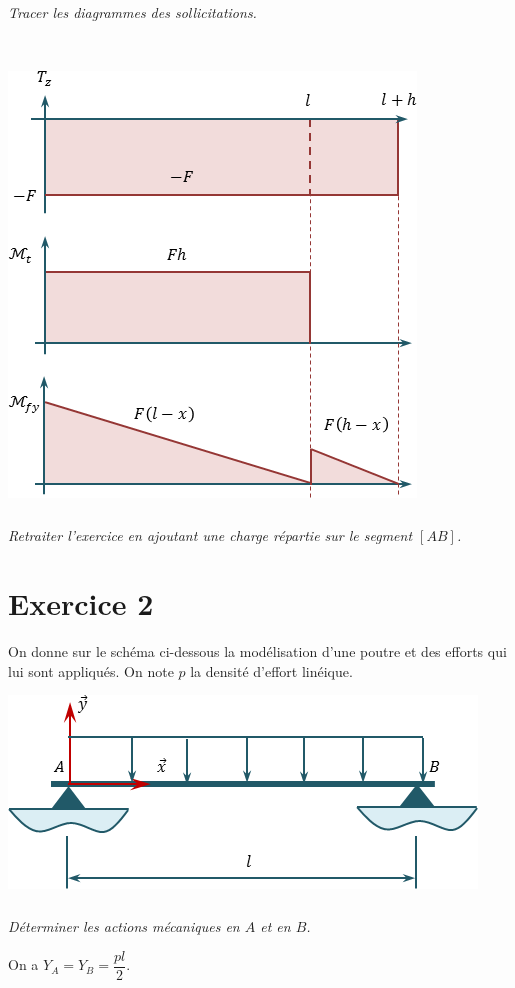 \documentclass[10pt,fleqn]{article} %
\begin{document}
\begin{multicols}{1}
\subparagraph{}
\textit{Tracer les diagrammes des sollicitations.}
\ifprof
\begin{corrige}~\\
\begin{center}
\includegraphics[width=.4\linewidth]{images/exo_02_corr_03}
\end{center}

\end{corrige}
\else 
\fi



\subparagraph{}
\textit{Retraiter l'exercice en ajoutant une charge répartie sur le segment $[AB]$.}
\ifprof
\begin{corrige}
\end{corrige}

\else 
\fi



\newpage




\section*{Exercice 2}
\setcounter{subparagraph}{0}
On donne sur le schéma ci-dessous la modélisation d'une poutre et des efforts qui lui sont appliqués. On note $p$ la densité d'effort linéique.
\begin{center}
\includegraphics[width=.45\textwidth]{images/exo_05}
\end{center}

\subparagraph{}
\textit{Déterminer les actions mécaniques en $A$ et en $B$.}
\ifprof
\begin{corrige}
On a $Y_A = Y_B = \dfrac{pl}{2}$.
\end{corrige}
\else 
\fi



\end{multicols}
\end{document}
